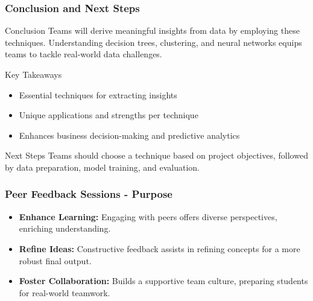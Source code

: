 \documentclass[aspectratio=169]{beamer}
\begin{document}
\begin{frame}[fragile]
    \frametitle{Conclusion and Next Steps}

    \begin{block}{Conclusion}
        Teams will derive meaningful insights from data by employing these techniques. Understanding decision trees, clustering, and neural networks equips teams to tackle real-world data challenges.
    \end{block}

    \begin{block}{Key Takeaways}
        \begin{itemize}
            \item Essential techniques for extracting insights
            \item Unique applications and strengths per technique
            \item Enhances business decision-making and predictive analytics
        \end{itemize}
    \end{block}

    \begin{block}{Next Steps}
        Teams should choose a technique based on project objectives, followed by data preparation, model training, and evaluation.
    \end{block}

\end{frame}

\begin{frame}[fragile]
    \frametitle{Peer Feedback Sessions - Purpose}
    \begin{itemize}
        \item \textbf{Enhance Learning:} Engaging with peers offers diverse perspectives, enriching understanding.
        \item \textbf{Refine Ideas:} Constructive feedback assists in refining concepts for a more robust final output.
        \item \textbf{Foster Collaboration:} Builds a supportive team culture, preparing students for real-world teamwork.
    \end{itemize}
\end{frame}
\end{document}

